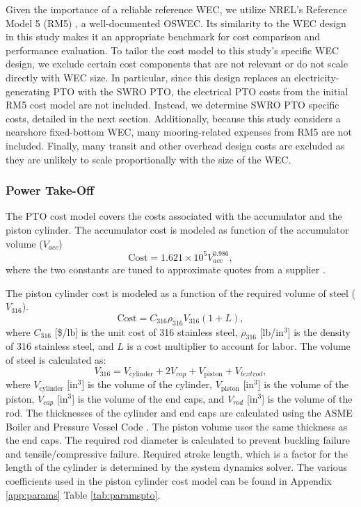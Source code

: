 \documentclass[twocolumn,10pt]{asme2e}
\begin{document}
Given the importance of a reliable reference WEC, we utilize NREL’s Reference Model 5 (RM5) \cite{rm5}, a well-documented OSWEC. Its similarity to the WEC design in this study makes it an appropriate benchmark for cost comparison and performance evaluation. To tailor the cost model to this study’s specific WEC design, we exclude certain cost components that are not relevant or do not scale directly with WEC size. In particular, since this design replaces an electricity-generating PTO with the SWRO PTO, the electrical PTO costs from the initial RM5 cost model are not included. Instead, we determine SWRO PTO specific costs, detailed in the next section. Additionally, because this study considers a nearshore fixed-bottom WEC, many mooring-related expenses from RM5 are not included. Finally, many transit and other overhead design costs are excluded as they are unlikely to scale proportionally with the size of the WEC. 

\subsubsection{Power Take-Off}

The PTO cost model covers the costs associated with the accumulator and the piston cylinder. The accumulator cost is modeled as function of the accumulator volume ($V_{acc}$)
\begin{equation}
    \text{Cost} = 1.621 \times 10^5 V_{acc} ^{0.986},
\end{equation}
\noindent where the two constants are tuned to approximate quotes from a supplier \cite{reasontek}. 

The piston cylinder cost is modeled as a function of the required volume of steel ($V_{\text{316}}$). 
\begin{equation}
    \text{Cost} = C_{\text{316}} \rho_{\text{316}} V_{\text{316}} (1+L),
\end{equation}
\noindent where $C_{\text{316}}$ [\$/lb] is the unit cost of 316 stainless steel, $\rho_{\text{316}}$ [lb/in$^3$] is the density of 316 stainless steel, and $L$ is a cost multiplier to account for labor. The volume of steel is calculated as:
\begin{equation}
    V_{\text{316}} = V_{\text{cylinder}} + 2V_{cap} + V_{\text{piston}} + V_{text{rod}},
\end{equation}
\noindent where $V_{\text{cylinder}}$ [in$^3$] is the volume of the cylinder, $V_{\text{piston}}$ [in$^3$] is the volume of the piston, $V_{cap}$ [in$^3$] is the volume of the end caps, and $V_{rod}$ [in$^3$] is the volume of the rod. The thicknesses of the cylinder and end caps are calculated using the ASME Boiler and Pressure Vessel Code \cite{ASME_BPVC}. The piston volume uses the same thickness as the end caps. The required rod diameter is calculated to prevent buckling failure and tensile/compressive failure. Required stroke length, which is a factor for the length of the cylinder is determined by the system dynamics solver. The various coefficients used in the piston cylinder cost model can be found in Appendix \ref{app:params} Table \ref{tab:paramspto}.
\end{document}
